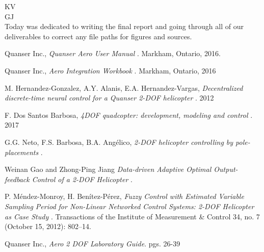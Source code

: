 \documentclass[fontsize=11pt, %
                             paper=letter, %
                             openany, %
                             captions=tableheading,
                             index=totoc,
                             hyperref]{labbook}
\begin{document}
\begin{addmargin}[0cm]{0cm}
KV\\


GJ\\
Today was dedicated to writing the final report and going through all of our deliverables to correct any file paths for figures and sources.




\end{addmargin}







\begin{thebibliography}{9}

Quanser Inc.,
\emph{Quanser Aero User Manual }.
Markham, Ontario,
2016.

Quanser Inc.,
\emph{Aero Integration Workbook }.
Markham, Ontario,
2016

M. Hernandez-Gonzalez, A.Y. Alanis, E.A. Hernandez-Vargas,
\emph{Decentralized discrete-time neural control for a Quanser 2-DOF helicopter }.
2012

F. Dos Santos Barbosa,
\emph{4DOF quadcopter: development, modeling and control }.
2017

G.G. Neto, F.S. Barbosa, B.A. Ang\'{e}lico,
\emph{2-DOF helicopter controlling by pole-placements }.

Weinan Gao and Zhong-Ping Jiang
\emph{Data-driven Adaptive Optimal Output-feedback Control of a 2-DOF Helicopter }.

P. Méndez-Monroy, H. Benítez-Pérez,
\emph{Fuzzy Control with Estimated Variable Sampling Period for Non-Linear Networked Control Systems: 2-DOF Helicopter as Case Study }. 
Transactions of the Institute of Measurement \& Control 34, no. 7 (October 15, 2012): 802–14. 

Quanser Inc.,
\emph{Aero 2 DOF Laboratory Guide}.
pgs. 26-39 %


\end{thebibliography}

\end{document}
